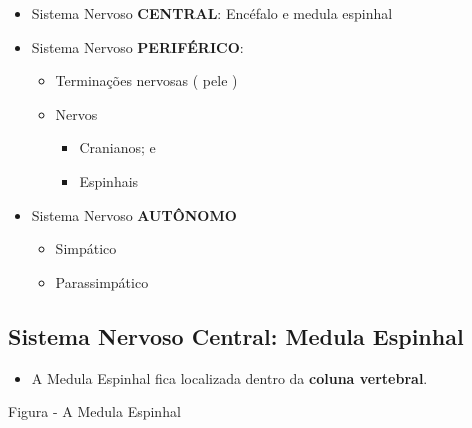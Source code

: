 \documentclass[
]{book}
\providecommand{\tightlist}{%
  \setlength{\itemsep}{0pt}\setlength{\parskip}{0pt}}
\begin{document}
\begin{itemize}
\tightlist
\item
  Sistema Nervoso \textbf{CENTRAL}: Encéfalo e medula espinhal
\item
  Sistema Nervoso \textbf{PERIFÉRICO}:

  \begin{itemize}
  \tightlist
  \item
    Terminações nervosas ( pele )
  \item
    Nervos

    \begin{itemize}
    \tightlist
    \item
      Cranianos; e
    \item
      Espinhais
    \end{itemize}
  \end{itemize}
\item
  Sistema Nervoso \textbf{AUTÔNOMO}

  \begin{itemize}
  \tightlist
  \item
    Simpático
  \item
    Parassimpático
  \end{itemize}
\end{itemize}

\hypertarget{sistema-nervoso-central-medula-espinhal}{%
\subsection{Sistema Nervoso Central: Medula Espinhal}\label{sistema-nervoso-central-medula-espinhal}}

\begin{itemize}
\tightlist
\item
  A Medula Espinhal fica localizada dentro da \textbf{coluna vertebral}.
\end{itemize}

Figura - A Medula Espinhal
\end{document}
